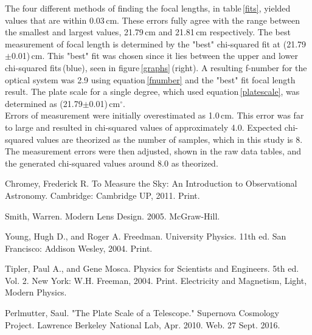 \documentclass[twocolumn]{aastex6}
\begin{document}
The four different methods of finding the focal lengths, in table\,\ref{fits}, yielded values that are within 0.03\,cm. These errors fully agree with the range between the smallest and largest values, 21.79\,cm and 21.81\,cm respectively. The best measurement of focal length is determined by the "best" chi-squared fit at (21.79$\pm$0.01)\,cm. This "best" fit was chosen since it lies between the upper and lower chi-squared fits\,(blue), seen in figure\,\ref{graphs}\,(right). A resulting f-number for the optical system was 2.9 using equation\,\ref{fnumber} and the "best" fit focal length result. The plate scale for a single degree, which used equation\,\ref{platescale}, was determined as (21.79$\pm$0.01)\,cm$^\circ$.
\\
\indent Errors of measurement were initially overestimated as 1.0\,cm. This error was far to large and resulted in chi-squared values of approximately 4.0. Expected chi-squared values are theorized as the number of samples, which in this study is 8. The measurement errors were then adjusted, shown in the raw data tables, and the generated chi-squared values around 8.0 as theorized. 





\vspace{5mm}

\begin{thebibliography}{}

Chromey, Frederick R. To Measure the Sky: An Introduction to Observational Astronomy. Cambridge: Cambridge UP, 2011. Print.


Smith, Warren. Modern Lens Design. 2005. McGraw-Hill.

Young, Hugh D., and Roger A. Freedman. University Physics. 11th ed. San Francisco: Addison Wesley, 2004. Print.

Tipler, Paul A., and Gene Mosca. Physics for Scientists and Engineers. 5th ed. Vol. 2. New York: W.H. Freeman, 2004. Print. Electricity and Magnetism, Light, Modern Physics.

Perlmutter, Saul. "The Plate Scale of a Telescope." Supernova Cosmology Project. Lawrence Berkeley National Lab, Apr. 2010. Web. 27 Sept. 2016.
\end{thebibliography}
\end{document}
